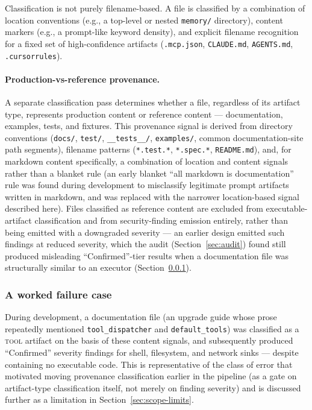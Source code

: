 \documentclass[sigconf,anonymous,review]{acmart}
\begin{document}
Classification is not purely filename-based. A file is classified by a combination of location conventions (e.g., a top-level or nested \texttt{memory/} directory), content markers (e.g., a prompt-like keyword density), and explicit filename recognition for a fixed set of high-confidence artifacts (\texttt{.mcp.json}, \texttt{CLAUDE.md}, \texttt{AGENTS.md}, \texttt{.cursorrules}).

\paragraph{Production-vs-reference provenance.} A separate classification pass determines whether a file, regardless of its artifact type, represents production content or reference content --- documentation, examples, tests, and fixtures. This provenance signal is derived from directory conventions (\texttt{docs/}, \texttt{test/}, \texttt{\_\_tests\_\_/}, \texttt{examples/}, common documentation-site path segments), filename patterns (\texttt{*.test.*}, \texttt{*.spec.*}, \texttt{README.md}), and, for markdown content specifically, a combination of location and content signals rather than a blanket rule (an early blanket ``all markdown is documentation'' rule was found during development to misclassify legitimate prompt artifacts written in markdown, and was replaced with the narrower location-based signal described here). Files classified as reference content are excluded from executable-artifact classification and from security-finding emission entirely, rather than being emitted with a downgraded severity --- an earlier design emitted such findings at reduced severity, which the audit (Section~\ref{sec:audit}) found still produced misleading ``Confirmed''-tier results when a documentation file was structurally similar to an executor (Section~\ref{sec:classify-example}).

\subsubsection{A worked failure case}
\label{sec:classify-example}
During development, a documentation file (an upgrade guide whose prose repeatedly mentioned \texttt{tool\_dispatcher} and \texttt{default\_tools}) was classified as a \textsc{tool} artifact on the basis of these content signals, and subsequently produced ``Confirmed'' severity findings for shell, filesystem, and network sinks --- despite containing no executable code. This is representative of the class of error that motivated moving provenance classification earlier in the pipeline (as a gate on artifact-type classification itself, not merely on finding severity) and is discussed further as a limitation in Section~\ref{sec:scope-limits}.
\end{document}
